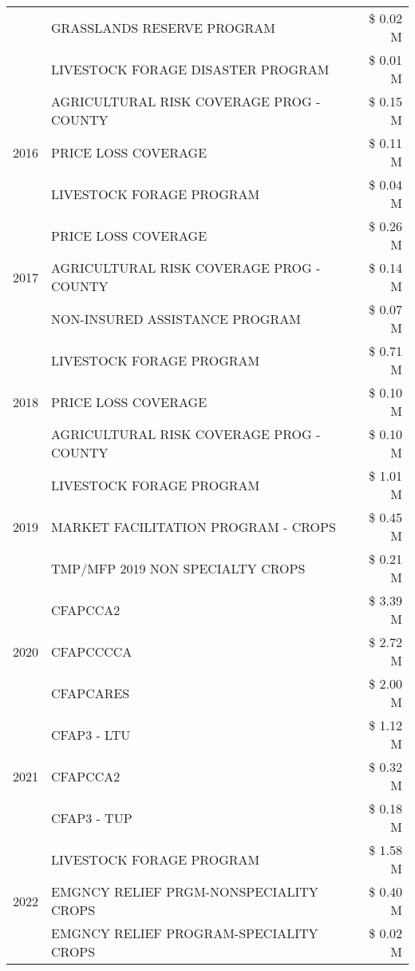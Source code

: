 \begin{tabular}{llr}
 & GRASSLANDS RESERVE PROGRAM & \$ 0.02 M \\
 & LIVESTOCK FORAGE DISASTER PROGRAM & \$ 0.01 M \\
\cline{1-3}
\multirow[t]{3}{*}{2016} & AGRICULTURAL RISK COVERAGE PROG - COUNTY & \$ 0.15 M \\
 & PRICE LOSS COVERAGE & \$ 0.11 M \\
 & LIVESTOCK FORAGE PROGRAM & \$ 0.04 M \\
\cline{1-3}
\multirow[t]{3}{*}{2017} & PRICE LOSS COVERAGE & \$ 0.26 M \\
 & AGRICULTURAL RISK COVERAGE PROG - COUNTY & \$ 0.14 M \\
 & NON-INSURED ASSISTANCE PROGRAM & \$ 0.07 M \\
\cline{1-3}
\multirow[t]{3}{*}{2018} & LIVESTOCK FORAGE PROGRAM & \$ 0.71 M \\
 & PRICE LOSS COVERAGE & \$ 0.10 M \\
 & AGRICULTURAL RISK COVERAGE PROG - COUNTY & \$ 0.10 M \\
\cline{1-3}
\multirow[t]{3}{*}{2019} & LIVESTOCK FORAGE PROGRAM & \$ 1.01 M \\
 & MARKET FACILITATION PROGRAM - CROPS & \$ 0.45 M \\
 & TMP/MFP 2019 NON SPECIALTY CROPS & \$ 0.21 M \\
\cline{1-3}
\multirow[t]{3}{*}{2020} & CFAPCCA2 & \$ 3.39 M \\
 & CFAPCCCCA & \$ 2.72 M \\
 & CFAPCARES & \$ 2.00 M \\
\cline{1-3}
\multirow[t]{3}{*}{2021} & CFAP3 - LTU & \$ 1.12 M \\
 & CFAPCCA2 & \$ 0.32 M \\
 & CFAP3 - TUP & \$ 0.18 M \\
\cline{1-3}
\multirow[t]{3}{*}{2022} & LIVESTOCK FORAGE PROGRAM & \$ 1.58 M \\
 & EMGNCY RELIEF PRGM-NONSPECIALITY CROPS & \$ 0.40 M \\
 & EMGNCY RELIEF PROGRAM-SPECIALITY CROPS & \$ 0.02 M \\
\cline{1-3}
\bottomrule
\end{tabular}
